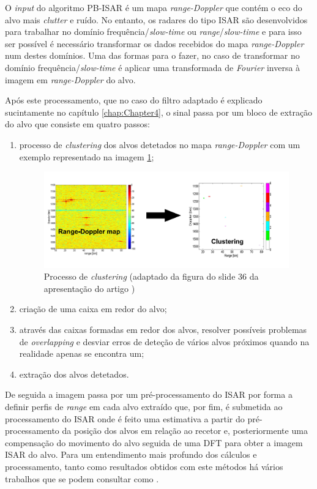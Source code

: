 O \textit{input} do algoritmo \gls{PB-ISAR} é um mapa \textit{range-Doppler} que contém o eco do alvo mais \textit{clutter} e ruído. No entanto, os radares do tipo \gls{ISAR} são desenvolvidos para trabalhar no domínio frequência/\textit{slow-time} ou \textit{range}/\textit{slow-time} e para isso ser possível é necessário transformar os dados recebidos do mapa \textit{range-Doppler} num destes domínios. Uma das formas para o fazer, no caso de transformar no domínio frequência/\textit{slow-time} é aplicar uma transformada de \textit{Fourier} inversa à imagem em \textit{range-Doppler} do alvo.\par 

Após este processamento, que no caso do filtro adaptado é explicado sucintamente no capítulo \ref{chap:Chapter4}, o sinal passa por um bloco de extração do alvo que consiste em quatro passos:
\begin{enumerate}
\item processo de \textit{clustering} dos alvos detetados no mapa \textit{range-Doppler} com um exemplo representado na imagem \ref{fig:cluster};

\begin{figure}[h]
\centering
\includegraphics[scale=0.6]{chapters/ch2/assets/cluster}
\caption[Processo de \textit{clustering}]{Processo de \textit{clustering} (adaptado da figura do slide 36 da apresentação do artigo \cite{Martorella2019})}
\label{fig:cluster}
\end{figure}

\item criação de uma caixa em redor do alvo;
\item através das caixas formadas em redor dos alvos, resolver possíveis problemas de \textit{overlapping} e desviar erros de deteção de vários alvos próximos quando na realidade apenas se encontra um;
\item extração dos alvos detetados.
\end{enumerate}

De seguida a imagem passa por um pré-processamento do \gls{ISAR} por forma a definir perfis de \textit{range} em cada alvo extraído que, por fim, é submetida ao processamento do \gls{ISAR} onde é feito uma estimativa a partir do pré-processamento da posição dos alvos em relação ao recetor e, posteriormente uma compensação do movimento do alvo seguida de uma \gls{DFT} para obter a imagem \gls{ISAR} do alvo. Para um entendimento mais profundo dos cálculos e processamento, tanto como resultados obtidos com este métodos há vários trabalhos que se podem consultar como \cite{Martorella2019}.
